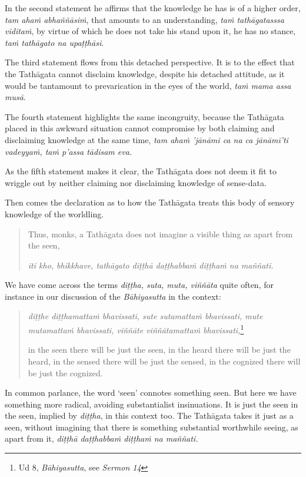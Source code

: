In the second statement he affirms that the knowledge he has is of a higher order, \emph{tam ahaṁ abhaññāsiṁ}, that amounts to an understanding, \emph{taṁ tathāgatasssa viditaṁ}, by virtue of which he does not take his stand upon it, he has no stance, \emph{taṁ tathāgato na upaṭṭhāsi}.

The third statement flows from this detached perspective. It is to the effect that the Tathāgata cannot disclaim knowledge, despite his detached attitude, as it would be tantamount to prevarication in the eyes of the world, \emph{taṁ mama assa musā}.

The fourth statement highlights the same incongruity, because the Tathāgata placed in this awkward situation cannot compromise by both claiming and disclaiming knowledge at the same time, \emph{tam ahaṁ 'jānāmi ca na ca jānāmī'ti vadeyyaṁ, taṁ p'assa tādisam eva.}

As the fifth statement makes it clear, the Tathāgata does not deem it fit to wriggle out by neither claiming nor disclaiming knowledge of sense-data.

Then comes the declaration as to how the Tathāgata treats this body of sensory knowledge of the worldling.

\begin{quote}
Thus, monks, a Tathāgata does not imagine a visible thing as apart from the seen,

\emph{iti kho, bhikkhave, tathāgato diṭṭhā daṭṭhabbaṁ diṭṭhaṁ na maññati.}
\end{quote}

We have come across the terms \emph{diṭṭha, suta, muta, viññāta} quite often, for instance in our discussion of the \emph{Bāhiyasutta} in the context:

\begin{quote}
\emph{diṭṭhe diṭṭhamattaṁ bhavissati, sute sutamattaṁ bhavissati, mute mutamattaṁ bhavissati, viññāte viññātamattaṁ bhavissati,}\footnote{Ud 8, \emph{Bāhiyasutta}, see \emph{Sermon 14}}

in the seen there will be just the seen, in the heard there will be just the heard, in the sensed there will be just the sensed, in the cognized there will be just the cognized.
\end{quote}

In common parlance, the word `seen' connotes something seen. But here we have something more radical, avoiding substantialist insinuations. It is just the seen in the seen, implied by \emph{diṭṭha}, in this context too. The Tathāgata takes it just as a seen, without imagining that there is something substantial worthwhile seeing, as apart from it, \emph{diṭṭhā daṭṭhabbaṁ diṭṭhaṁ na maññati.}

